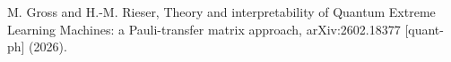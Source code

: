 
M. Gross and H.-M. Rieser,
Theory and interpretability of Quantum Extreme Learning Machines: a Pauli-transfer matrix approach,
arXiv:2602.18377 [quant-ph] (2026).

